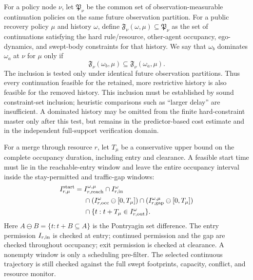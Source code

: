 \documentclass[letterpaper]{article} %
\begin{document}
For a policy node $\nu$, let $\mathfrak P_\nu$ be the common set of
observation-measurable continuation policies on the same future observation
partition. For a public recovery policy $\mu$ and history $\omega$, define
$\mathfrak F_\nu(\omega,\mu)\subseteq\mathfrak P_\nu$ as the set
of continuations satisfying the hard rule/resource, other-agent occupancy,
ego-dynamics, and swept-body constraints for that history. We say that
$\omega_b$ dominates $\omega_a$ at $\nu$ for $\mu$ only if
\begin{equation}
\mathfrak F_\nu(\omega_b,\mu)\subseteq
\mathfrak F_\nu(\omega_a,\mu).
\label{eq:domination}
\end{equation}
The inclusion is tested only under identical future observation partitions.
Thus every continuation feasible for the retained, more restrictive history
is also feasible for the removed history. This inclusion must be established
by sound constraint-set inclusion; heuristic comparisons such as ``larger
delay'' are insufficient. A dominated history may be omitted from the finite
hard-constraint master only after this test, but remains in the predictor-based
cost estimate and in the independent full-support verification domain.

For a merge through resource $r$, let $T_\mu$ be a conservative upper bound
on the complete occupancy duration, including entry and clearance. A feasible
start time must lie in the reachable-entry window and leave the entire
occupancy interval inside the stay-permitted and traffic-gap windows:
\begin{equation}
\begin{aligned}
I_{r,\mu}^{\rm start}={}&I_{r,\rm reach}^{\omega,\mu}
\cap I_{r,\rm in}^{\omega}\\
&\cap(I_{r,\rm occ}^{\omega}\ominus[0,T_\mu])
\cap(I_{r,\rm gap}^{\omega,\mu}\ominus[0,T_\mu])\\
&\cap\{t:t+T_\mu\in I_{r,\rm out}^{\omega}\}.
\end{aligned}
\label{eq:window}
\end{equation}
Here $A\ominus B=\{t:t+B\subseteq A\}$ is the Pontryagin
set difference. The entry permission $I_{r,\rm in}$ is checked at entry;
continued permission and the gap are checked throughout occupancy; exit
permission is checked at clearance. A nonempty window is only a scheduling
pre-filter. The selected continuous trajectory is still checked against the
full swept footprints, capacity, conflict, and resource monitor.
\end{document}
